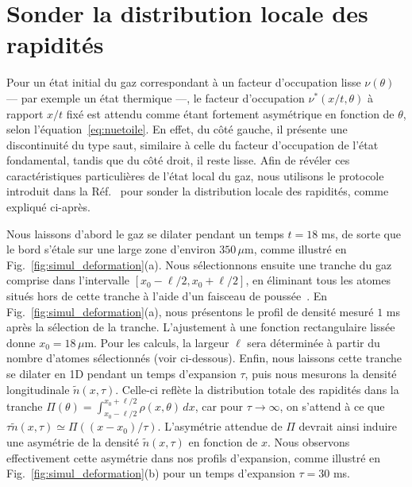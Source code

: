 \section{Sonder la distribution locale des rapidités}
\label{sec:local}

Pour un état initial du gaz correspondant à un facteur d'occupation lisse $\nu(\theta)$ — par exemple un état thermique —, le facteur d'occupation $\nu^*(x/t,\theta)$ à rapport $x/t$ fixé est attendu comme étant fortement asymétrique en fonction de $\theta$, selon l'équation~\eqref{eq:nuetoile}. En effet, du côté gauche, il présente une discontinuité du type saut, similaire à celle du facteur d'occupation de l’état fondamental, tandis que du côté droit, il reste lisse. Afin de révéler ces caractéristiques particulières de l’état local du gaz, nous utilisons le protocole introduit dans la Réf.~\cite{dubois_probing_2024} pour sonder la distribution locale des rapidités, comme expliqué ci-après.

Nous laissons d’abord le gaz se dilater pendant un temps $t=18$ ms, de sorte que le bord s’étale sur une large zone d’environ $350\,\mu$m, comme illustré en Fig.~\ref{fig:simul_deformation}(a).  
Nous sélectionnons ensuite une tranche du gaz comprise dans l’intervalle $[x_0-\ell/2, x_0+\ell/2]$, en éliminant tous les atomes situés hors de cette tranche à l’aide d’un faisceau de poussée~\cite{dubois_probing_2024}.  
En Fig.~\ref{fig:simul_deformation}(a), nous présentons le profil de densité mesuré $1$ ms après la sélection de la tranche.  
L’ajustement à une fonction rectangulaire lissée donne $x_0 = 18\,\mu$m.  
Pour les calculs, la largeur $\ell$ sera déterminée à partir du nombre d’atomes sélectionnés (voir ci-dessous).  
Enfin, nous laissons cette tranche se dilater en 1D pendant un temps d’expansion $\tau$, puis nous mesurons la densité longitudinale $\tilde{n}(x,\tau)$.  
Celle-ci reflète la distribution totale des rapidités dans la tranche $\Pi(\theta) = \int_{x_0 - \ell/2}^{x_0 + \ell/2} \rho(x, \theta)\, dx$, car pour $\tau \rightarrow \infty$, on s’attend à ce que $\tau \tilde{n}(x,\tau) \simeq \Pi((x-x_0)/\tau)$.  
L’asymétrie attendue de $\Pi$ devrait ainsi induire une asymétrie de la densité $\tilde{n}(x,\tau)$ en fonction de $x$.  
Nous observons effectivement cette asymétrie dans nos profils d’expansion, comme illustré en Fig.~\ref{fig:simul_deformation}(b) pour un temps d’expansion $\tau=30$ ms.


